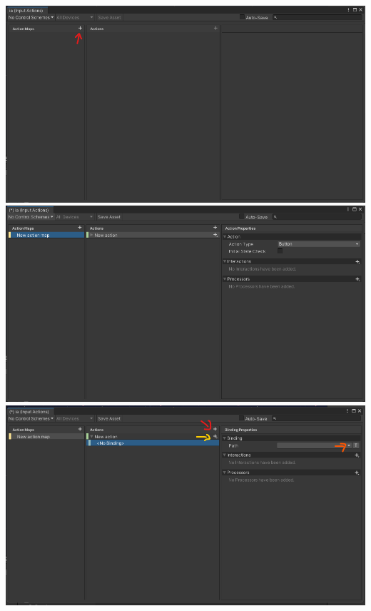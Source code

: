 \documentclass{beamer}
\begin{document}
\begin{frame}
\begin{columns}
			\includegraphics[height=0.28\textheight]{is-2}
			\includegraphics[height=0.28\textheight]{is-3}
			\includegraphics[height=0.28\textheight]{is-4}
		\end{columns}
	\end{frame}
\end{document}
